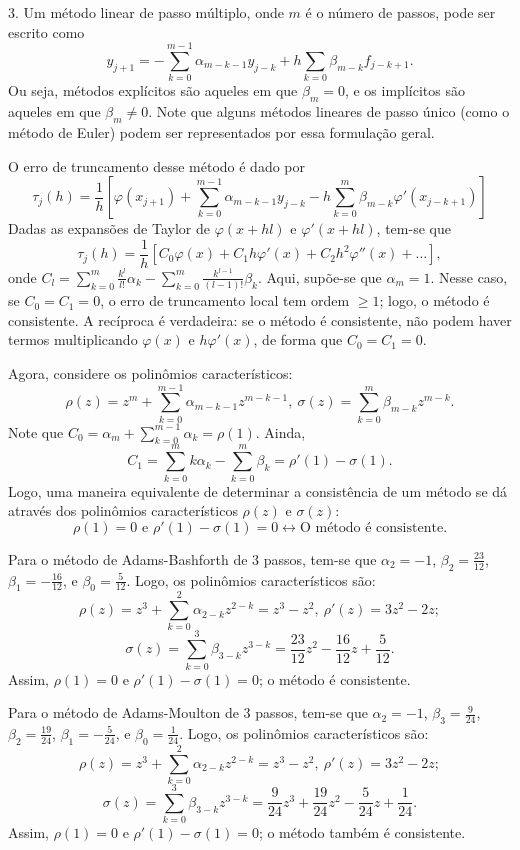 \documentclass[10pt,a4paper]{article}
\newcommand{\vs}{\vspace{0.2cm}}
\begin{document}
\vs
3. Um método linear de passo múltiplo, onde $m$ é o número de passos, pode ser escrito como
\[y_{j + 1} = -\sum_{k = 0}^{m - 1} \alpha_{m - k - 1} y_{j - k} + h \sum_{k = 0} \beta_{m - k} f_{j - k + 1}.\]
Ou seja, métodos explícitos são aqueles em que $\beta_m = 0$, e os implícitos são aqueles em que $\beta_m \neq 0$. Note que alguns métodos lineares de passo único (como o método de Euler) podem ser representados por essa formulação geral.

O erro de truncamento desse método é dado por
\[\tau_j(h) = \frac{1}{h} \left[ \varphi(x_{j + 1}) + \sum_{k = 0}^{m - 1} \alpha_{m - k - 1} y_{j - k} - h \sum_{k = 0}^m \beta_{m - k} \varphi'(x_{j - k + 1}) \right] \]
Dadas as expansões de Taylor de $\varphi(x + hl)$ e $\varphi'(x + hl)$, tem-se que
\[\tau_j(h) = \frac{1}{h} \left[ C_0 \varphi(x) + C_1 h \varphi'(x) + C_2 h^2 \varphi''(x) + \dots \right],\]
onde $C_l = \sum_{k = 0}^m \frac{k^l}{l!} \alpha_k - \sum_{k = 0}^m \frac{k^{l - 1}}{(l - 1)!} \beta_k$. Aqui, supõe-se que $\alpha_m = 1$. Nesse caso, se $C_0 = C_1 = 0$, o erro de truncamento local tem ordem $\geq 1$; logo, o método é consistente. A recíproca é verdadeira: se o método é consistente, não podem haver termos multiplicando $\varphi(x)$ e $h \varphi'(x)$, de forma que $C_0 = C_1 = 0$.

Agora, considere os polinômios característicos:
\[\rho(z) = z^m + \sum_{k = 0}^{m - 1} \alpha_{m - k - 1} z^{m - k - 1}, \ \sigma(z) = \sum_{k = 0}^m \beta_{m - k} z^{m - k}.\]
Note que $C_0 = \alpha_m + \sum_{k = 0}^{m - 1} \alpha_k = \rho(1)$. Ainda,
\[C_1 = \sum_{k = 0}^m k \alpha_k - \sum_{k = 0}^m \beta_k = \rho'(1) - \sigma(1).\]
Logo, uma maneira equivalente de determinar a consistência de um método se dá através dos polinômios característicos $\rho(z)$ e $\sigma(z)$:
\[\rho(1) = 0 \text{ e } \rho'(1) - \sigma(1) = 0 \longleftrightarrow \text{O método é consistente.}\]

Para o método de Adams-Bashforth de 3 passos, tem-se que $\alpha_2 = -1$, $\beta_2 = \frac{23}{12}$, $\beta_1 = -\frac{16}{12}$, e $\beta_0 = \frac{5}{12}$. Logo, os polinômios característicos são:
\[\rho(z) = z^3 + \sum_{k = 0}^2 \alpha_{2 - k} z^{2 - k} = z^3 - z^2, \ \rho'(z) = 3 z^2 - 2z;\]
\[\sigma(z) = \sum_{k = 0}^3 \beta_{3 - k} z^{3 - k} = \frac{23}{12} z^2 - \frac{16}{12} z + \frac{5}{12}.\]
Assim, $\rho(1) = 0$ e $\rho'(1) - \sigma(1) = 0$; o método é consistente.

Para o método de Adams-Moulton de 3 passos, tem-se que $\alpha_2 = -1$, $\beta_3 = \frac{9}{24}$, $\beta_2 = \frac{19}{24}$, $\beta_1 = -\frac{5}{24}$, e $\beta_0 = \frac{1}{24}$. Logo, os polinômios característicos são:
\[\rho(z) = z^3 + \sum_{k = 0}^2 \alpha_{2 - k} z^{2 - k} = z^3 - z^2, \ \rho'(z) = 3 z^2 - 2z;\]
\[\sigma(z) = \sum_{k = 0}^3 \beta_{3 - k} z^{3 - k} = \frac{9}{24} z^3 + \frac{19}{24} z^2 - \frac{5}{24} z + \frac{1}{24}.\]
Assim, $\rho(1) = 0$ e $\rho'(1) - \sigma(1) = 0$; o método também é consistente.
\end{document}

